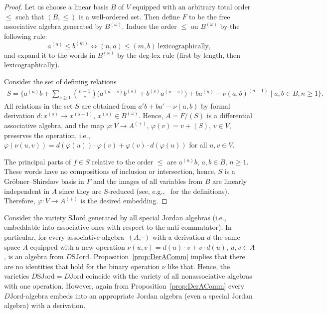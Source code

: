 \documentclass[pdftex]{sigma}
\numberwithin{equation}{section}
\def\Jord{\mathrm{Jord}}
\def\SJord{\mathrm{SJord}}
\begin{document}
\begin{proof}
Let us choose a linear basis $B$ of $V$
equipped with an arbitrary total order $\le $
such that $(B,\le )$ is a well-ordered set.
Then define $F$ to be the free associative algebra
generated by $B^{(\omega )}$.
Induce the order $\le $ on $B^{(\omega )}$
by the following rule:
\[
a^{(n)} \le b^{(m)} \iff (n,a)\le (m,b)\ \text{lexicographically},
\]
and expand it to the words in $B^{(\omega )}$ by the deg-lex rule
(first by length, then lexicographically).

Consider the set of defining relations
\begin{gather*}
S = \bigg\{a^{(n)}b + \sum\limits_{s\ge 1} \binom{n-1}{s}\!
\bigl(a^{(n-s)}b^{(s)} +b^{(s)}a^{(n-s)} \bigr)
+ba^{(n)} - \nu(a,b)^{(n-1)} \mid a,b\in B, n\ge 1\bigg \}.
\end{gather*}
All relations in the set $S$ are obtained
from $a'b+ba'-\nu(a,b)$ by formal derivation
$d\colon x^{(s)}\to x^{(s+1)}$, $x^{(s)}\in B^{(\omega )}$.
Hence, $A=F/(S)$ is a differential associative algebra,
and the map $\varphi \colon V\to A^{(+)}$, $\varphi( v)= v+(S)$, $v\in V$,
preserves the operation, i.e.,
$\varphi(\nu(u,v)) =
d(\varphi(u))\cdot \varphi (v) +\varphi(v)\cdot d(\varphi(u))$ for all $u,v\in V$.

The principal parts of $f\in S$ relative to the order
$\le $ are $a^{(n)}b$, $a,b\in B$, $n\ge 1$.
These words have no compositions of inclusion or intersection, hence, $S$ is a Gr\"obner--Shirshov
basis in $F$ and the images of all variables from $B$ are linearly independent in $A$ since they are $S$-reduced (see, e.g.,~\cite{BC-bull2014} for the
definitions).
Therefore, $\varphi \colon V\to A^{(+)}$ is the desired embedding.
\end{proof}

Consider the variety $\SJord$ generated by all special Jordan algebras (i.e., embeddable into associative ones with respect
to the anti-commutator).
In particular, for every associative algebra~$(A,\cdot)$ with a derivation $d$
the same space $A$ equipped with a new operation
$\nu(u,v) = d(u)\cdot v + v\cdot d(u)$, $u,v\in A$,
is an algebra from $D\SJord$.
Proposition~\ref{prop:DerAComm} implies that
there are no identities that hold for the binary operation $\nu $
like that. Hence, the varieties $D\SJord = D\Jord$ coincide
with the variety of all nonassociative algebras with one operation.
However, again from Proposition~\ref{prop:DerAComm} every
$D\Jord $-algebra embeds into an appropriate Jordan algebra
(even a special Jordan algebra)
with a derivation.
\end{document}
